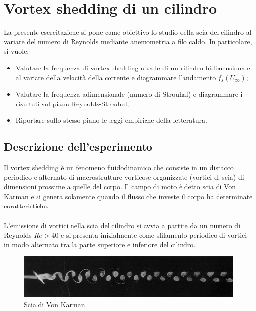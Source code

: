 \section{Vortex shedding di un cilindro}
La presente esercitazione si pone come obiettivo lo studio della scia del cilindro al variare del numero di Reynolds mediante anemometria a filo caldo. In particolare, si vuole:
\begin{itemize}
    \item Valutare la frequenza di vortex shedding a valle di un cilindro bidimensionale al variare della velocità della corrente e diagrammare l'andamento $f_s(U_\infty)$;
    \item Valutare la frequenza adimensionale (numero di Strouhal) e diagrammare i risultati sul piano Reynolds-Strouhal;
    \item Riportare sullo stesso piano le leggi empiriche della letteratura.
\end{itemize}

\subsection{Descrizione dell'esperimento}
Il vortex shedding è un fenomeno fluidodinamico che consiste in un distacco periodico e alternato di macrostrutture vorticose organizzate (vortici di scia) di dimensioni prossime a quelle del corpo. Il campo di moto è detto scia di Von Karman e si genera solamente quando il flusso che investe il corpo ha determinate caratteristiche.\\\\
L'emissione di vortici nella scia del cilindro si avvia a partire da un numero di Reynolds $Re>40$ e si presenta inizialmente come sfilamento periodico di vortici in modo alternato tra la parte superiore e inferiore del cilindro.
\begin{figure}[h]
    \centering
    \includegraphics[width=\textwidth]{images/10/vortices.png}
    \caption{Scia di Von Karman}
\end{figure}

